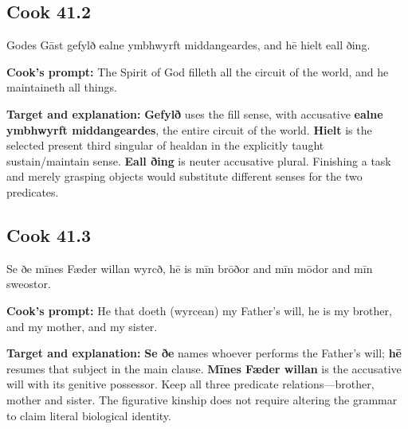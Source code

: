 \par\begin{minipage}{\linewidth}\raggedright
\subsection*{Cook 41.2}

Godes Gāst gefylð ealne ymbhwyrft middangeardes, and hē hielt eall ðing.

\textbf{Cook's prompt:} The Spirit of God filleth all the circuit of the world, and he maintaineth all things.

\textbf{Target and explanation:} \textbf{Gefylð} uses the fill sense, with accusative \textbf{ealne ymbhwyrft middangeardes}, the entire circuit of the world. \textbf{Hielt} is the selected present third singular of healdan in the explicitly taught sustain/\allowbreak{}maintain sense. \textbf{Eall ðing} is neuter accusative plural. Finishing a task and merely grasping objects would substitute different senses for the two predicates.

\end{minipage}\par\addvspace{4pt}

\par\begin{minipage}{\linewidth}\raggedright
\subsection*{Cook 41.3}

Se ðe mīnes Fæder willan wyrcð, hē is mīn brōðor and mīn mōdor and mīn sweostor.

\textbf{Cook's prompt:} He that doeth (wyrcean) my Father’s will, he is my brother, and my mother, and my sister.

\textbf{Target and explanation:} \textbf{Se ðe} names whoever performs the Father's will; \textbf{hē} resumes that subject in the main clause. \textbf{Mīnes Fæder willan} is the accusative will with its genitive possessor. Keep all three predicate relations—brother, mother and sister. The figurative kinship does not require altering the grammar to claim literal biological identity.

\end{minipage}\par\addvspace{4pt}

